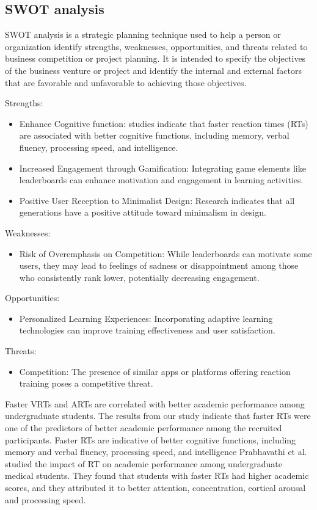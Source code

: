\documentclass[]{VUMIFTemplateClass}
\begin{document}
\subsection{SWOT analysis}

SWOT analysis is a strategic planning technique used to help a person or organization identify strengths, weaknesses, opportunities, and threats related to business competition or project planning. It is intended to specify the objectives of the business venture or project and identify the internal and external factors that are favorable and unfavorable to achieving those objectives.

Strengths:
\begin{itemize}
    \item Enhance Cognitive function: studies indicate that faster reaction times (RTs) are associated with better cognitive functions, including memory, verbal fluency, processing speed, and intelligence.
    \item Increased Engagement through Gamification: Integrating game elements like leaderboards can enhance motivation and engagement in learning activities.
    \item Positive User Reception to Minimalist Design: Research indicates that all generations have a positive attitude toward minimalism in design.
\end{itemize}
Weaknesses:
\begin{itemize}
    \item Risk of Overemphasis on Competition: While leaderboards can motivate some users, they may lead to feelings of sadness or disappointment among those who consistently rank lower, potentially decreasing engagement.
\end{itemize}
Opportunities:
\begin{itemize}
    \item Personalized Learning Experiences: Incorporating adaptive learning technologies can improve training effectiveness and user satisfaction.
\end{itemize}
Threats:
\begin{itemize}
    \item Competition: The presence of similar apps or platforms offering reaction training poses a competitive threat.
\end{itemize}

Faster VRTs and ARTs are correlated with better academic performance among undergraduate students.
The results from our study indicate that faster RTs were one of the predictors of better academic performance among the recruited participants. Faster RTs are indicative of better cognitive functions, including memory and verbal fluency, processing speed, and intelligence 
Prabhavathi et al. studied the impact of RT on academic performance among undergraduate medical students. They found that students with faster RTs had higher academic scores, and they attributed it to better attention, concentration, cortical arousal and processing speed. \cite{CognitiveFunction}
\end{document}
